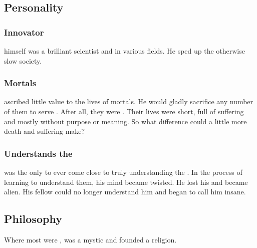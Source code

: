 \subsection{Personality}





\subsubsection{Innovator}
\Sethicus himself was a brilliant scientist and  in various fields. 
He sped up the otherwise slow \ophidian society. 





\subsubsection{Mortals}
\Sethicus ascribed little value to the lives of mortals. 
He would gladly sacrifice any number of them to serve . 
After all, they were . 
Their lives were short, full of suffering and mostly without purpose or meaning.
So what difference could a little more death and suffering make?





\subsubsection{Understands the \xss}
\Sethicus was the only \dragon to ever come close to truly understanding the \xss.
In the process of learning to understand them, his mind became twisted. 
He lost his  and became alien. 
His fellow \ophidians could no longer understand him and began to call him insane.









\subsection{Philosophy}
Where most \ophidians were , \Sethicus was a mystic and founded a religion. 





